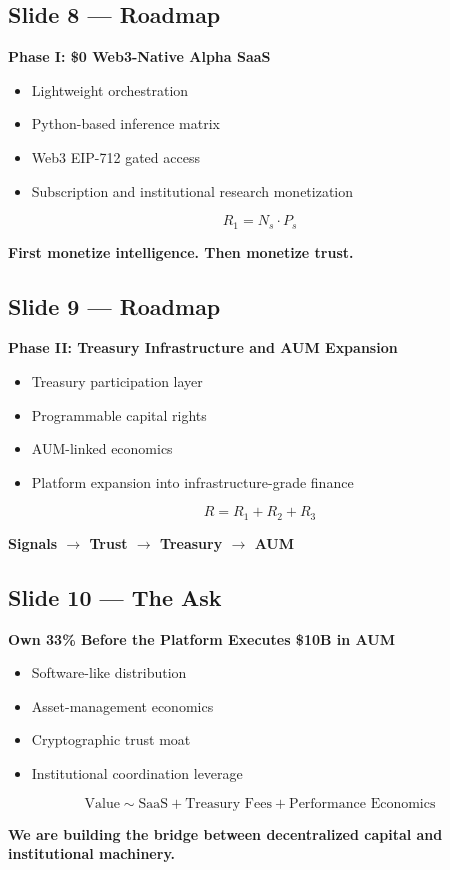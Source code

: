 \documentclass[11pt]{article}
\newcommand{\decktitle}[1]{
  \vspace{0.5em}
  {\Large\bfseries\color{wolfred} #1}
  \vspace{0.5em}
}
\begin{document}
\subsection*{Slide 8 --- Roadmap}
\begin{slidebox}
\decktitle{Phase I: \$0 Web3-Native Alpha SaaS}
\begin{itemize}[leftmargin=1.5em]
  \item Lightweight orchestration
  \item Python-based inference matrix
  \item Web3 EIP-712 gated access
  \item Subscription and institutional research monetization
\end{itemize}

\[
R_1 = N_s \cdot P_s
\]

\textbf{First monetize intelligence. Then monetize trust.}
\end{slidebox}

\subsection*{Slide 9 --- Roadmap}
\begin{slidebox}
\decktitle{Phase II: Treasury Infrastructure and AUM Expansion}
\begin{itemize}[leftmargin=1.5em]
  \item Treasury participation layer
  \item Programmable capital rights
  \item AUM-linked economics
  \item Platform expansion into infrastructure-grade finance
\end{itemize}

\[
R = R_1 + R_2 + R_3
\]

\textbf{Signals \(\rightarrow\) Trust \(\rightarrow\) Treasury \(\rightarrow\) AUM}
\end{slidebox}

\subsection*{Slide 10 --- The Ask}
\begin{slidebox}
\decktitle{Own 33\% Before the Platform Executes \$10B in AUM}
\begin{itemize}[leftmargin=1.5em]
  \item Software-like distribution
  \item Asset-management economics
  \item Cryptographic trust moat
  \item Institutional coordination leverage
\end{itemize}

\[
\text{Value} \sim \text{SaaS} + \text{Treasury Fees} + \text{Performance Economics}
\]

\textbf{We are building the bridge between decentralized capital and institutional machinery.}
\end{slidebox}
\end{document}
